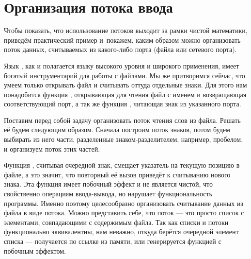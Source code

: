 \section{Организация потока ввода}%
Чтобы показать, что использование потоков выходит за рамки чистой математики, приведём практический пример и~покажем, каким образом можно организовать поток данных, считываемых из какого-либо порта (файла или сетевого порта).

Язык \Scheme, как и полагается языку высокого уровня и широкого применения, имеет богатый инструментарий для работы с файлами. Мы же притворимся сейчас, что умеем только открывать файл и считывать оттуда отдельные знаки. Для этого нам понадобится функция , открывающая для чтения файл с именем  и возвращающая соответствующий порт, а так же функция , читающая знак из указанного порта. 

Поставим перед собой задачу организовать поток чтения слов из файла. Решать её будем следующим образом. Сначала построим поток знаков, потом будем выбирать из него части, разделенные знаком-разделителем, например, пробелом, и организуем поток этих частей.

Функция , считывая очередной знак, смещает указатель на текущую позицию в файле, а это значит, что повторный её вызов приведёт к считыванию нового знака. Эта функция имеет побочный эффект и не является чистой, что свойственно операциям ввода-вывода, но нарушает функциональность программы. Именно поэтому целесообразно организовать считывание данных из файла в виде потока. Можно представить себе, что поток --- это просто список с элементами, совпадающими с содержимым файла. Так как списки и потоки функционально эквивалентны, нам неважно, откуда берётся очередной элемент списка --- получается по ссылке из памяти, или генерируется функцией с побочным эффектом.

